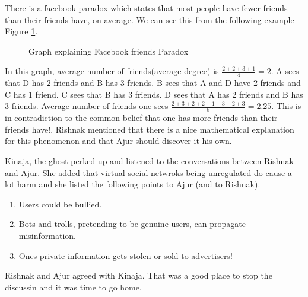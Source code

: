  There is a facebook paradox which states that most people have fewer friends than their friends have, on average. We can see this from the following example Figure \ref{21g1}.
 \begin{figure}
\begin{center}
\caption{ Graph explaining Facebook friends Paradox}\label{21g1}
\end{center}
\end{figure}

In this graph, average number of friends(average degree) is $\frac{2+2+3+1}{4}=2$.  A sees that D has 2 friends and B has 3 friends. B sees that A and D have 2 friends and C has 1 friend. C sees that B has 3 friends. D sees that A has 2 friends and B has 3 friends. Average number of friends one sees 
$\frac{2+3+2+2+1+3+2+3}{8}=2.25$. This is in contradiction to the common belief that one has more friends than their friends have!. Rishnak mentioned that there is a nice mathematical explanation for this phenomenon and that Ajur should discover it his own.

Kinaja, the ghost perked up and listened to the conversations between Rishnak and Ajur. She added that virtual social netwroks being unregulated do cause a lot harm and she listed the following points to Ajur (and to Rishnak).
\begin{enumerate}
    \item Users could be bullied.
    \item  Bots and trolls, pretending to be genuine users,  can propagate misinformation.
    \item  Ones private information gets stolen or sold to advertisers!
\end{enumerate}

Rishnak and Ajur agreed with Kinaja. That was a good place to stop the discussin and it was time to go home.